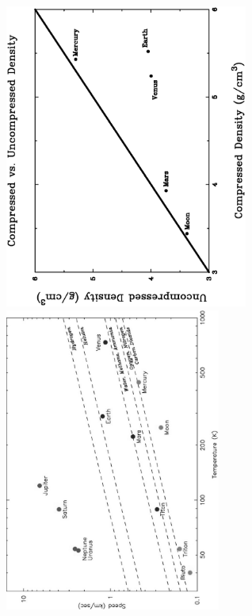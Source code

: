\begin{center}
\vfill
\mbox{\includegraphics[height=10cm]{./images/UnCompressed.ps}}
\makebox[0.5cm]{}
\mbox{\includegraphics[height=10cm]{./images/Atmos_Escape.ps}}
\vfill
\end{center}

\normalsize
\clearpage



